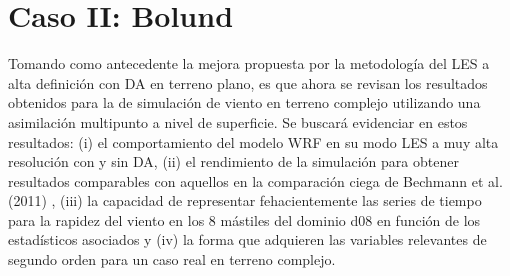 \newpage
\section{Caso II: Bolund}
Tomando como antecedente la mejora propuesta por la metodología del LES a alta definición con DA en terreno plano, es que ahora se revisan los resultados obtenidos para la de simulación de viento en terreno complejo utilizando una asimilación multipunto a nivel de superficie. Se buscará evidenciar en estos resultados: (i) el comportamiento del modelo WRF en su modo LES a muy alta resolución con y sin DA, (ii) el rendimiento de la simulación para obtener resultados comparables con aquellos en la comparación ciega de Bechmann et al. (2011) \cite{Bechmann2011}, (iii) la capacidad de representar fehacientemente las series de tiempo para la rapidez del viento en los 8 mástiles del dominio d08 en función de los estadísticos asociados y (iv) la forma que adquieren las variables relevantes de segundo orden para un caso real en terreno complejo.

